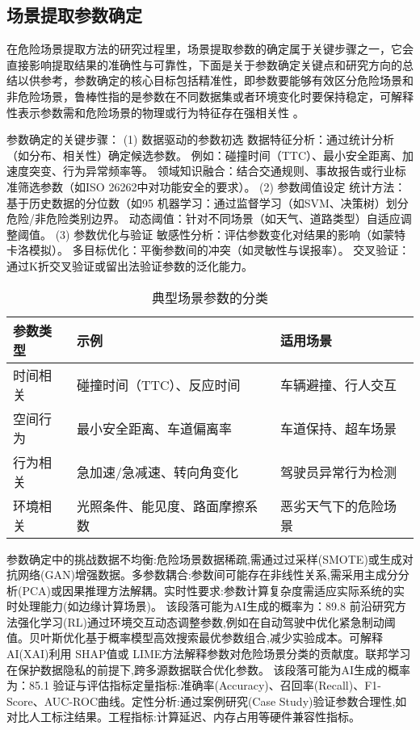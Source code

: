 \subsection{场景提取参数确定}

在危险场景提取方法的研究过程里，场景提取参数的确定属于关键步骤之一，它会直接影响提取结果的准确性与可靠性，下面是关于参数确定关键点和研究方向的总结以供参考，参数确定的核心目标包括精准性，即参数要能够有效区分危险场景和非危险场景，鲁棒性指的是参数在不同数据集或者环境变化时要保持稳定，可解释性表示参数需和危险场景的物理或行为特征存在强相关性 。

参数确定的关键步骤：
(1) 数据驱动的参数初选
数据特征分析：通过统计分析（如分布、相关性）确定候选参数。
例如：碰撞时间（TTC）、最小安全距离、加速度突变、行为异常频率等。
领域知识融合：结合交通规则、事故报告或行业标准筛选参数（如ISO 26262中对功能安全的要求）。
(2) 参数阈值设定
统计方法：基于历史数据的分位数（如95%
机器学习：通过监督学习（如SVM、决策树）划分危险/非危险类别边界。
动态阈值：针对不同场景（如天气、道路类型）自适应调整阈值。
(3) 参数优化与验证
敏感性分析：评估参数变化对结果的影响（如蒙特卡洛模拟）。
多目标优化：平衡参数间的冲突（如灵敏性与误报率）。
交叉验证：通过K折交叉验证或留出法验证参数的泛化能力。


\begin{table}[htb]
	\centering
	\caption{典型场景参数的分类}
	\label{T.example}
\begin{tabular}{lll}
	\hline
	参数类型 & 示例  & 适用场景 \\
	\hline
	时间相关 & 碰撞时间（TTC）、反应时间 & 车辆避撞、行人交互 \\
	\hline
	空间行为 & 最小安全距离、车道偏离率 & 车道保持、超车场景 \\
	\hline
	行为相关 & 急加速/急减速、转向角变化 & 驾驶员异常行为检测 \\
	\hline
	环境相关 & 光照条件、能见度、路面摩擦系数 & 恶劣天气下的危险场景 \\
	\hline
\end{tabular}
\end{table}


参数确定中的挑战数据不均衡:危险场景数据稀疏,需通过过采样(SMOTE)或生成对抗网络(GAN)增强数据。多参数耦合:参数间可能存在非线性关系,需采用主成分分析(PCA)或因果推理方法解耦。实时性要求:参数计算复杂度需适应实际系统的实时处理能力(如边缘计算场景)。
该段落可能为AI生成的概率为：89.8%
前沿研究方法强化学习(RL)通过环境交互动态调整参数,例如在自动驾驶中优化紧急制动阈值。贝叶斯优化基于概率模型高效搜索最优参数组合,减少实验成本。可解释 AI(XAI)利用 SHAP值或 LIME方法解释参数对危险场景分类的贡献度。联邦学习在保护数据隐私的前提下,跨多源数据联合优化参数。
该段落可能为AI生成的概率为：85.1%
验证与评估指标定量指标:准确率(Accuracy)、召回率(Recall)、F1-Score、AUC-ROC曲线。定性分析:通过案例研究(Case Study)验证参数合理性,如对比人工标注结果。工程指标:计算延迟、内存占用等硬件兼容性指标。\cite{neale2002100}


